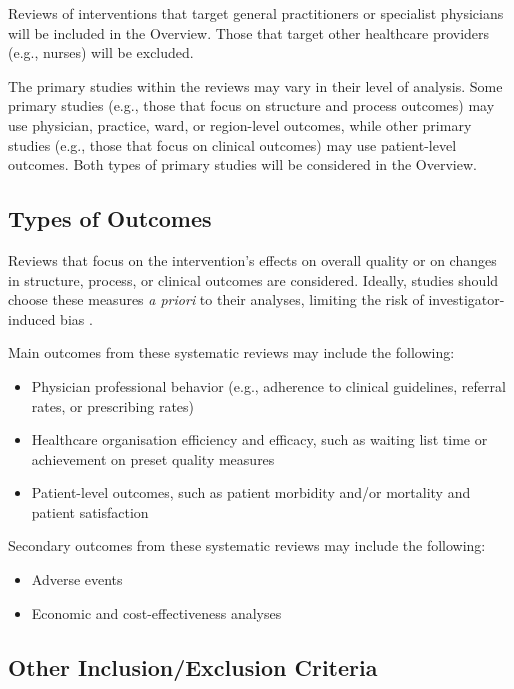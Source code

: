 \documentclass[12pt]{article}
\begin{document}
Reviews of interventions that target general practitioners or specialist physicians will be included in the Overview. Those that target other healthcare providers (e.g., nurses) will be excluded.

The primary studies within the reviews may vary in their level of analysis. Some primary studies (e.g., those that focus on structure and process outcomes) may use physician, practice, ward, or region-level outcomes, while other primary studies (e.g., those that focus on clinical outcomes) may use patient-level outcomes. Both types of primary studies will be considered in the Overview.


\subsection{Types of Outcomes}

Reviews that focus on the intervention's effects on overall quality or on changes in structure, process, or clinical outcomes are considered. Ideally, studies should choose these measures \emph{a priori} to their analyses, limiting the risk of investigator-induced bias \citep{ioannidisWhyMostPublished2005}.

Main outcomes from these systematic reviews may include the following:

\begin{itemize}
  \item Physician professional behavior (e.g., adherence to clinical guidelines, referral rates, or prescribing rates)
  \item Healthcare organisation efficiency and efficacy, such as waiting list time or achievement on preset quality measures
  \item Patient-level outcomes, such as patient morbidity and/or mortality and patient satisfaction
\end{itemize}

Secondary outcomes from these systematic reviews may include the following:

\begin{itemize}
  \item Adverse events
  \item Economic and cost-effectiveness analyses
\end{itemize}


\subsection{Other Inclusion/Exclusion Criteria}
\end{document}
